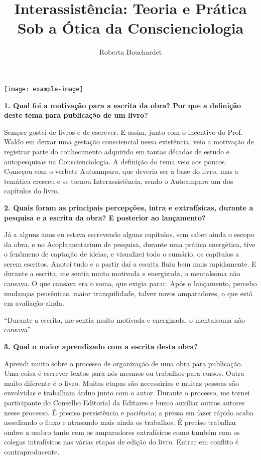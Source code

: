 \documentclass{gescons}
\author{Roberta Bouchardet}
\title{Interassistência: Teoria e Prática Sob a Ótica da Conscienciologia}
\begin{document}
    \makeentrevistatitle

    \begin{multicols}{2}


\noindent\texttt{[image: example-image]} 


\textbf{1.       Qual foi a motivação para a escrita da obra? Por que a definição deste tema para publicação de um livro?}

Sempre gostei de livros e de escrever. E assim, junto com o incentivo do Prof. Waldo em deixar uma gestação consciencial nessa existência, veio a motivação de registrar parte do conhecimento adquirido em tantas décadas de estudo e autopesquisas na Conscienciologia. A definição do tema veio aos poucos. Começou com o verbete Autoamparo, que deveria ser a base do livro, mas a temática cresceu e se tornou Interassistência, sendo o Autoamparo um dos capítulos do livro.

\textbf{2.       Quais foram as principais percepções, intra e extrafísicas, durante a pesquisa e a escrita da obra? E posterior ao lançamento?}

Já a alguns anos eu estava escrevendo alguns capítulos, sem saber ainda o escopo da obra, e no Acoplamentarium de pesquisa, durante uma prática energética, tive o fenômeno de captação de ideias, e visualizei todo o sumário, os capítulos a serem escritos. Anotei tudo e a partir daí a escrita fluiu bem mais rapidamente. E durante a escrita, me sentia muito motivada e energizada, o mentalsoma não cansava. O que cansava era o soma, que exigia parar. Após o lançamento, percebo mudanças pensênicas, maior tranquilidade, talvez novos amparadores, o que está em avaliação ainda.

\begin{pullquote}
    ``Durante a escrita, me sentia muito motivada e energizada, o mentalsoma não cansava''
\end{pullquote}


\textbf{3.       Qual o maior aprendizado com a escrita desta obra?}

Aprendi muito sobre o processo de organização de uma obra para publicação. Uma coisa é escrever textos para nós mesmos ou trabalhos para cursos. Outra muito diferente é o livro. Muitas etapas são necessárias e muitas pessoas são envolvidas e trabalham árduo junto com o autor. Durante o processo, me tornei participante do Conselho Editorial da Editares e busco auxiliar outros autores nesse processo. É preciso persistência e paciência; a pressa em fazer rápido acaba assediando o fluxo e atrasando mais ainda os trabalhos. É preciso trabalhar ombro a ombro tanto com os amparadores extrafísicos como também com os colegas intrafísicos nas várias etapas de edição do livro. Entrar em conflito é contraproducente.


\end{multicols}
\end{document}
